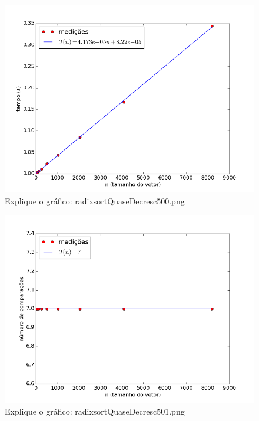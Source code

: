 \documentclass[12pt,a4paper,twoside]{report}
\begin{document}


\begin{figure}[ht]
\centering \includegraphics[scale=0.8]{../radixsort/imagens/radixsortQuaseDecresc500.png}
\caption{Explique o gráfico: radixsortQuaseDecresc500.png}
\label{fig:radixsortQuaseDecresc500}
\end{figure}

\begin{figure}[ht]
\centering \includegraphics[scale=0.8]{../radixsort/imagens/radixsortQuaseDecresc501.png}
\caption{Explique o gráfico: radixsortQuaseDecresc501.png}
\label{fig:radixsortQuaseDecresc501}
\end{figure}
\end{document}
